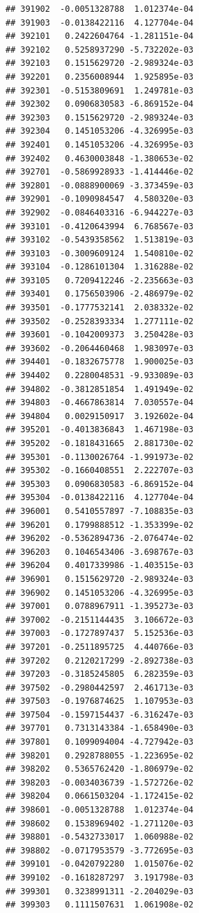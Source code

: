 \begin{frame}[fragile]
\begin{verbatim}
## 391902  -0.0051328788  1.012374e-04
## 391903  -0.0138422116  4.127704e-04
## 392101   0.2422604764 -1.281151e-04
## 392102   0.5258937290 -5.732202e-03
## 392103   0.1515629720 -2.989324e-03
## 392201   0.2356008944  1.925895e-03
## 392301  -0.5153809691  1.249781e-03
## 392302   0.0906830583 -6.869152e-04
## 392303   0.1515629720 -2.989324e-03
## 392304   0.1451053206 -4.326995e-03
## 392401   0.1451053206 -4.326995e-03
## 392402   0.4630003848 -1.380653e-02
## 392701  -0.5869928933 -1.414446e-02
## 392801  -0.0888900069 -3.373459e-03
## 392901  -0.1090984547  4.580320e-03
## 392902  -0.0846403316 -6.944227e-03
## 393101  -0.4120643994  6.768567e-03
## 393102  -0.5439358562  1.513819e-03
## 393103  -0.3009609124  1.540810e-02
## 393104  -0.1286101304  1.316288e-02
## 393105   0.7209412246 -2.235663e-03
## 393401   0.1756503906 -2.486979e-02
## 393501  -0.1777532141  2.038332e-02
## 393502  -0.2528393334  1.277111e-02
## 393601  -0.1042009373  3.250428e-03
## 393602  -0.2064460468  1.983097e-03
## 394401  -0.1832675778  1.900025e-03
## 394402   0.2280048531 -9.933089e-03
## 394802  -0.3812851854  1.491949e-02
## 394803  -0.4667863814  7.030557e-04
## 394804   0.0029150917  3.192602e-04
## 395201  -0.4013836843  1.467198e-03
## 395202  -0.1818431665  2.881730e-02
## 395301  -0.1130026764 -1.991973e-02
## 395302  -0.1660408551  2.222707e-03
## 395303   0.0906830583 -6.869152e-04
## 395304  -0.0138422116  4.127704e-04
## 396001   0.5410557897 -7.108835e-03
## 396201   0.1799888512 -1.353399e-02
## 396202  -0.5362894736 -2.076474e-02
## 396203   0.1046543406 -3.698767e-03
## 396204   0.4017339986 -1.403515e-03
## 396901   0.1515629720 -2.989324e-03
## 396902   0.1451053206 -4.326995e-03
## 397001   0.0788967911 -1.395273e-03
## 397002  -0.2151144435  3.106672e-03
## 397003  -0.1727897437  5.152536e-03
## 397201  -0.2511895725  4.440766e-03
## 397202   0.2120217299 -2.892738e-03
## 397203  -0.3185245805  6.282359e-03
## 397502  -0.2980442597  2.461713e-03
## 397503  -0.1976874625  1.107953e-03
## 397504  -0.1597154437 -6.316247e-03
## 397701   0.7313143384 -1.658490e-03
## 397801   0.1099094004 -4.727942e-03
## 398201   0.2928788055 -1.223695e-02
## 398202   0.5365762420 -1.806979e-02
## 398203  -0.0034036739 -1.572726e-02
## 398204   0.0661503204 -1.172415e-02
## 398601  -0.0051328788  1.012374e-04
## 398602   0.1538969402 -1.271120e-03
## 398801  -0.5432733017  1.060988e-02
## 398802  -0.0717953579 -3.772695e-03
## 399101  -0.0420792280  1.015076e-02
## 399102  -0.1618287297  3.191798e-03
## 399301   0.3238991311 -2.204029e-03
## 399303   0.1111507631  1.061908e-02

\end{verbatim}
\end{frame}
